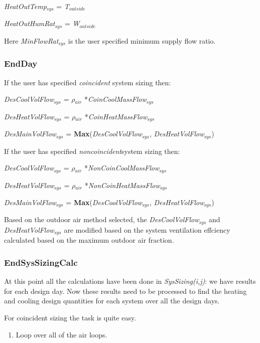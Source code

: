 \emph{HeatOutTemp\(_{sys}\)} = \emph{T\(_{outside}\)}

\emph{HeatOutHumRat\(_{sys}\)} = \emph{W\(_{outside}\)}

Here \emph{MinFlowRat\(_{sys}\)} is the user specified minimum supply flow ratio.

\subsubsection{EndDay}\label{endday}

If the user has specified \emph{coincident} system sizing then:

\emph{DesCoolVolFlow\(_{sys}\)} = \emph{$\rho$\(_{air}\)} *\emph{CoinCoolMassFlow\(_{sys}\)}

\emph{DesHeatVolFlow\(_{sys}\)} = \emph{$\rho$\(_{air}\)} *\emph{CoinHeatMassFlow\(_{sys}\)}

\emph{DesMainVolFlow\(_{sys}\)} = \textbf{Max}(\emph{DesCoolVolFlow\(_{sys}\)}, \emph{DesHeatVolFlow\(_{sys}\)})

If the user has specified \emph{noncoincident}system sizing then:

\emph{DesCoolVolFlow\(_{sys}\)} = \emph{$\rho$\(_{air}\)} *\emph{NonCoinCoolMassFlow\(_{sys}\)}

\emph{DesHeatVolFlow\(_{sys}\)} = \emph{$\rho$\(_{air}\)} *\emph{NonCoinHeatMassFlow\(_{sys}\)}

\emph{DesMainVolFlow\(_{sys}\)} = \textbf{Max}(\emph{DesCoolVolFlow\(_{sys}\)}, \emph{DesHeatVolFlow\(_{sys}\)})

Based on the outdoor air method selected, the \emph{DesCoolVolFlow\(_{sys}\)} and \emph{DesHeatVolFlow\(_{sys}\)} are modified based on the system ventilation effciency calculated based on the maximum outdoor air fraction.

\subsubsection{EndSysSizingCalc}\label{endsyssizingcalc}

At this point all the calculations have been done in \emph{SysSizing(i,j)}: we have results for each design day. Now these results need to be processed to find the heating and cooling design quantities for each system over all the design days.

For coincident sizing the task is quite easy.

\begin{enumerate}
\def\labelenumi{(\arabic{enumi})}
\tightlist
\item
  Loop over all of the air loops. 
\end{enumerate}

